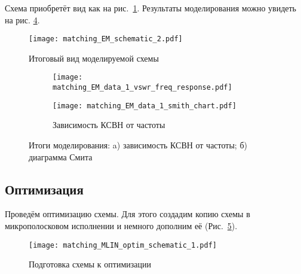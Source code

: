 Схема приобретёт вид как на рис.~\ref{fig:matching_EM_schematic_2}. Результаты моделирования можно увидеть на рис. \ref{fig:matching_EM_data_1}.
\begin{figure}[!ht]
    \centering
    \texttt{[image: matching\_EM\_schematic\_2.pdf]}
    \caption{Итоговый вид моделируемой схемы}%
    \label{fig:matching_EM_schematic_2}
\end{figure}
\begin{figure}[!ht]
    \centering
    \begin{subfigure}[b]{0.55\textwidth}
        \centering
        \texttt{[image: matching\_EM\_data\_1\_vswr\_freq\_response.pdf]}
        \caption{}%
    \label{fig:matching_EM_data_1_vswr_freq_response}
    \end{subfigure}
    \hfill
    \begin{subfigure}[b]{0.35\textwidth}
        \centering
        \texttt{[image: matching\_EM\_data\_1\_smith\_chart.pdf]}
        \caption{Зависимость КСВН от частоты}%
    \label{fig:matching_EM_data_1_smith_chart}
    \end{subfigure}
    \caption{
        Итоги моделирования:
        a) зависимость КСВН от частоты;
        б) диаграмма Смита
    }%
    \label{fig:matching_EM_data_1}
\end{figure}

\subsection{Оптимизация}

Проведём оптимизацию схемы. Для этого создадим копию схемы в микрополосковом исполнении и немного дополним её (Рис.~\ref{fig:matching_MLIN_optim_schematic_1}).

\begin{figure}
    \centering
    \texttt{[image: matching\_MLIN\_optim\_schematic\_1.pdf]}
    \caption{Подготовка схемы к оптимизации}%
    \label{fig:matching_MLIN_optim_schematic_1}
\end{figure}
